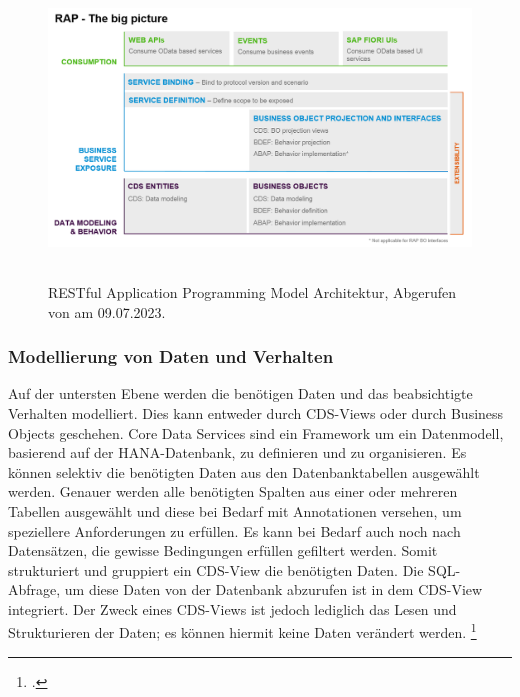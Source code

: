 \begin{figure}[h]
    \centering
    \includegraphics[height=8cm]{Bilder/RAP_Architektur.png}
    \caption[RESTful Application Programming Model Architektur]{RESTful Application Programming Model Architektur, Abgerufen von \cite{sap_rap_2023} am 09.07.2023.}
    \label{fig:iso_norm}
\end{figure}

\subsubsection{Modellierung von Daten und Verhalten}

Auf der untersten Ebene werden die benötigen Daten und das beabsichtigte Verhalten modelliert. Dies kann entweder durch CDS-Views oder durch Business Objects geschehen. Core Data Services sind ein Framework um ein Datenmodell, basierend auf der HANA-Datenbank, zu definieren und zu organisieren. Es können selektiv die benötigten Daten aus den Datenbanktabellen ausgewählt werden. Genauer werden alle benötigten Spalten aus einer oder mehreren Tabellen ausgewählt und diese bei Bedarf mit Annotationen versehen, um speziellere Anforderungen zu erfüllen. Es kann bei Bedarf auch noch nach Datensätzen, die gewisse Bedingungen erfüllen gefiltert werden. Somit strukturiert und gruppiert ein CDS-View die benötigten Daten. Die SQL-Abfrage, um diese Daten von der Datenbank abzurufen ist in dem CDS-View integriert. Der Zweck eines CDS-Views ist jedoch lediglich das Lesen und Strukturieren der Daten; es können hiermit keine Daten verändert werden. \footcite[Vgl.][]{sap_rap_2023}

